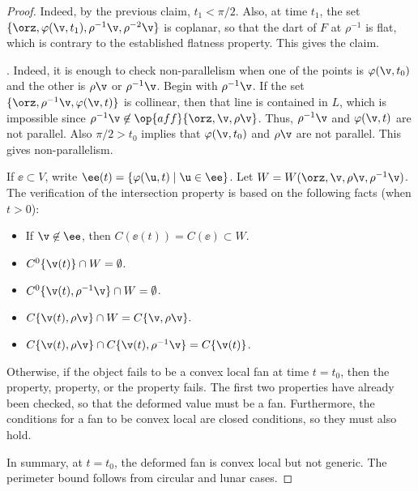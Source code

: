\begin{proof}
Indeed,
by the previous claim, $t_1 <\pi/2$.  
Also, at time $t_1$,  the set $\{\orz,\varphi(\v,t_1),\rho^{-1}\v,\rho^{-2}\v\}$ is coplanar,
so that the dart of $F$ at $\rho^{-1}$ is flat, which is contrary to the established flatness
property.  This gives the claim.

.  Indeed, it
is enough to check non-parallelism when one of the points is
$\varphi(\v,t_0)$ and the other is $\rho\v$ or $\rho^{-1}\v$.  
Begin with $\rho^{-1}\v$.  If the set $\{\orz,\rho^{-1}\v,\varphi(\v,t)\}$ is collinear,
then that line is contained
in $L$,
which is impossible since $\rho^{-1}\v\not\in
\op{aff}\{\orz,\v,\rho\v\}$.  Thus, $\rho^{-1}\v$ and $\varphi(\v,t)$
are not parallel.
Also  $\pi/2 > t_0$ implies that $\varphi(\v,t_0)$ and $\rho\v$ are
not parallel. This gives non-parallelism.

  If $\ee\subset V$,
write $\ee(t) = \{\varphi(\u,t) \mid \u\in \ee\}$.  Let $W
=W(\orz,\v,\rho\v,\rho^{-1}\v)$. The verification of the intersection
property is based on the following facts (when $t>0$):
\begin{itemize} 
\item If $\v\not\in \ee$, then $C(\ee(t))=C(\ee)\subset W$.
\item $C^0\{\v(t)\} \cap W = \emptyset$.
\item $C^0\{\v(t),\rho^{-1}\v\}\cap W = \emptyset$.
\item $C\{\v(t),\rho\v\}\cap W = C\{\v,\rho\v\}.$
\item $C\{\v(t),\rho\v\}\cap C\{\v(t),\rho^{-1}\v\} = C\{\v(t)\}$.
\end{itemize}

Otherwise, if the object fails to be a convex local fan at time $t=t_0$, then the
 property,  property, or the
 property fails.  The first two properties have already
been checked, so that the deformed value must be a fan.  Furthermore,
the conditions for a fan to be convex local are closed conditions, so they
must also hold.

In summary, at $t=t_0$, the deformed fan is convex local but not generic.  The perimeter
bound follows from circular and lunar cases.
\end{proof}

